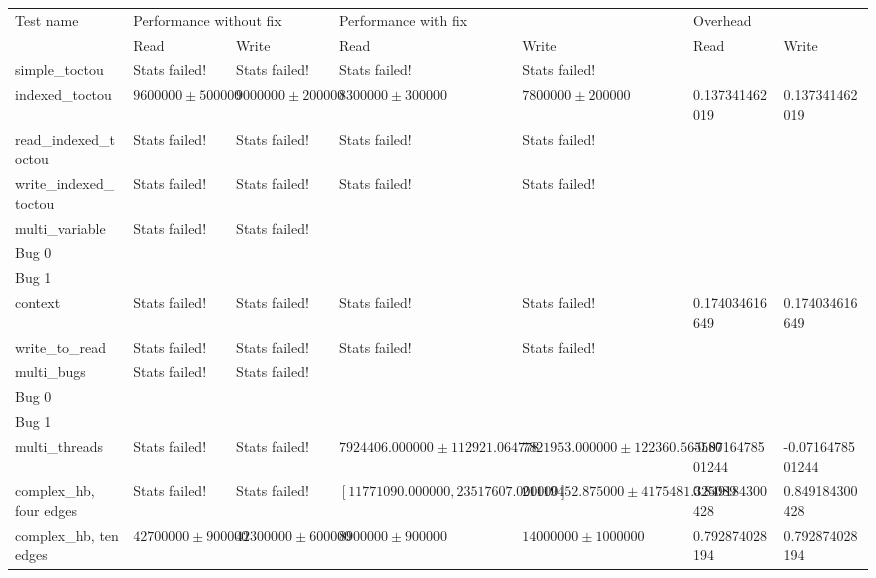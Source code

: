 \begin{tabular}{lllllll}
Test name              & \multicolumn{2}{l}{Performance without fix} & \multicolumn{2}{l}{Performance with fix} & \multicolumn{2}{l}{Overhead}\\
                       & Read & Write                                & Read & Write                             & Read & Write \\
\hline
\hline{}simple\_toctou       & Stats failed!        & Stats failed!        & Stats failed!        & Stats failed!        &  & \\
\hline{}indexed\_toctou      & $9600000 \pm 500000$ & $9000000 \pm 200000$ & $8300000 \pm 300000$ & $7800000 \pm 200000$ & 0.137341462019
 & 0.137341462019
\\
\hline{}read\_indexed\_toctou & Stats failed!        & Stats failed!        & Stats failed!        & Stats failed!        &  & \\
\hline{}write\_indexed\_toctou & Stats failed!        & Stats failed!        & Stats failed!        & Stats failed!        &  & \\
\hline{}multi\_variable      & Stats failed!        & Stats failed!        & \\
\hspace{20pt}Bug 0  & & &                      &                      &  & \\
\hspace{20pt}Bug 1  & & &                      &                      &  & \\
\hline{}context              & Stats failed!        & Stats failed!        & Stats failed!        & Stats failed!        & 0.174034616649
 & 0.174034616649
\\
\hline{}write\_to\_read      & Stats failed!        & Stats failed!        & Stats failed!        & Stats failed!        &  & \\
\hline{}multi\_bugs          & Stats failed!        & Stats failed!        & \\
\hspace{20pt}Bug 0  & & &                      &                      &  & \\
\hspace{20pt}Bug 1  & & &                      &                      &  & \\
\hline{}multi\_threads       & Stats failed!        & Stats failed!        & $7924406.000000 \pm 112921.064778$ & $7821953.000000 \pm 122360.565580$ & -0.0716478501244
 & -0.0716478501244
\\
\hline{}complex\_hb, four edges & Stats failed!        & Stats failed!        & $[11771090.000000, 23517607.000000]$ & $21119452.875000 \pm 4175481.325089$ & 0.849184300428
 & 0.849184300428
\\
\hline{}complex\_hb, ten edges & $42700000 \pm 900000$ & $42300000 \pm 600000$ & $8900000 \pm 900000$ & $14000000 \pm 1000000$ & 0.792874028194
 & 0.792874028194
\\
\end{tabular}

